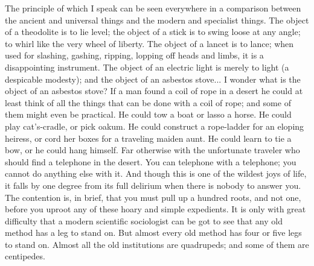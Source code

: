 \documentclass{book}
\begin{document}
The principle of which I speak can be seen everywhere in a comparison between the ancient and universal things and the modern and specialist things. The object of a theodolite is to lie level; the object of a stick is to swing loose at any angle; to whirl like the very wheel of liberty. The object of a lancet is to lance; when used for slashing, gashing, ripping, lopping off heads and limbs, it is a disappointing instrument. The object of an electric light is merely to light (a despicable modesty); and the object of an asbestos stove... I wonder what is the object of an asbestos stove? If a man found a coil of rope in a desert he could at least think of all the things that can be done with a coil of rope; and some of them might even be practical. He could tow a boat or lasso a horse. He could play cat’s-cradle, or pick oakum. He could construct a rope-ladder for an eloping heiress, or cord her boxes for a traveling maiden aunt. He could learn to tie a bow, or he could hang himself. Far otherwise with the unfortunate traveler who should find a telephone in the desert. You can telephone with a telephone; you cannot do anything else with it. And though this is one of the wildest joys of life, it falls by one degree from its full delirium when there is nobody to answer you. The contention is, in brief, that you must pull up a hundred roots, and not one, before you uproot any of these hoary and simple expedients. It is only with great difficulty that a modern scientific sociologist can be got to see that any old method has a leg to stand on. But almost every old method has four or five legs to stand on. Almost all the old institutions are quadrupeds; and some of them are centipedes.
\end{document}
